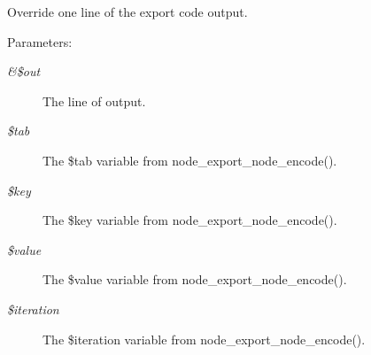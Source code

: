 Override one line of the export code output.

\begin{Desc}
\item[Parameters:]
\begin{description}
\item[{\em \&\$out}]The line of output. \item[{\em \$tab}]The \$tab variable from node\_\-export\_\-node\_\-encode(). \item[{\em \$key}]The \$key variable from node\_\-export\_\-node\_\-encode(). \item[{\em \$value}]The \$value variable from node\_\-export\_\-node\_\-encode(). \item[{\em \$iteration}]The \$iteration variable from node\_\-export\_\-node\_\-encode(). \end{description}
\end{Desc}
